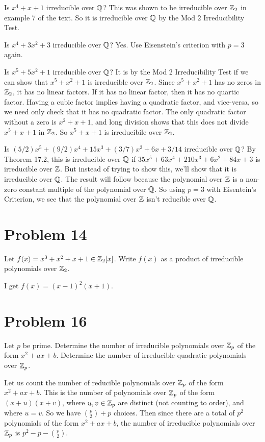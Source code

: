 \documentclass{article}
\begin{document}
Is $x^4+x+1$ irreducible over $\mathbb{Q}$?  This was shown to be
irreducible over $\mathbb{Z}_2$ in example 7 of the text.  So it is
irreducible over $\mathbb{Q}$ by the Mod $2$ Irreducibility Test.

Is $x^4+3x^2+3$ irreducible over $\mathbb{Q}$?  Yes.  Use Eisenstein's criterion
with $p=3$ again.

Is $x^5+5x^2+1$ irreducible over $\mathbb{Q}$?  It is by the Mod 2 Irreducibility Test if
we can show that $x^5+x^2+1$ is irreducible over $\mathbb{Z}_2$.  Since $x^5+x^2+1$
has no zeros in $\mathbb{Z}_2$, it has no linear factors.  If it has no linear factor,
then it has no quartic factor.
Having a cubic factor implies
having a quadratic factor, and vice-versa, so we need only check that it has no quadratic
factor.  The only quadratic factor without a zero is $x^2+x+1$, and long division shows that
this does not divide $x^5+x+1$ in $\mathbb{Z}_2$.  So $x^5+x+1$ is irreducibile over $\mathbb{Z}_2$.

Is $(5/2)x^5+(9/2)x^4+15x^3+(3/7)x^2+6x+3/14$ irreducible over $\mathbb{Q}$?
By Theorem 17.2, this is irreducible over $\mathbb{Q}$ if $35x^5+63x^4+210x^3+6x^2+84x+3$
is irreducible over $\mathbb{Z}$.  But instead of trying to show this, we'll show
that it is irreducible over $\mathbb{Q}$.  The result will follow because the polynomial
over $\mathbb{Z}$ is a non-zero constant multiple of the polynomial over $\mathbb{Q}$.
So using $p=3$ with Eisentein's Criterion,
we see that the polynomial over $\mathbb{Z}$ isn't reducible over $\mathbb{Q}$.

\section*{Problem 14}

Let $f(x)=x^3+x^2+x+1\in\mathbb{Z}_2[x]$.  Write $f(x)$ as a product of irreducible polynomials over $\mathbb{Z}_2$.

I get $f(x)=(x-1)^2(x+1)$.

\section*{Problem 16}

Let $p$ be prime.  Determine the number of irreducible polynomials over $\mathbb{Z}_p$ of
the form $x^2+ax+b$.  Determine the number of irreducible quadratic polynomials over $\mathbb{Z}_p$.

Let us count the number of reducible polynomials over $\mathbb{Z}_p$ of the form $x^2+ax+b$.
This is the number of polynomials over $\mathbb{Z}_p$ of the form $(x+u)(x+v)$, where $u,v\in\mathbb{Z}_p$
are distinct (not counting to order), and where $u=v$.  So we have $\binom{p}{2}+p$ choices.  Then since
there are a total of $p^2$ polynomials of the form $x^2+ax+b$, the number of irreducible polynomials
over $\mathbb{Z}_p$ is $p^2-p-\binom{p}{2}$.
\end{document}
